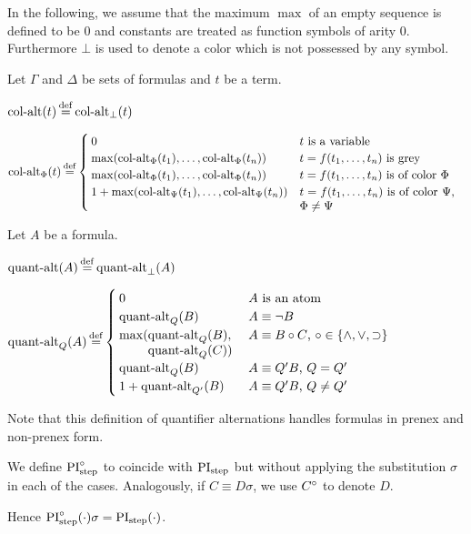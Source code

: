 \documentclass[,%
	draft=false,%
	numbers=noendperiod
	12pt,
	a4paper,
	oneside,%
	openany,
]{memoir}
\begin{document}
In the following, we assume that the maximum $\max$ of an empty sequence is defined to be $0$ and constants are treated as function symbols of arity $0$.
Furthermore $\bot$ is used to denote a color which is not possessed by any symbol.
\begin{defi}
	Let $\Gamma$ and $\Delta$ be sets of formulas and $t$ be a term.

	\medskip

	\noindent
	$\ca(t) \defeq \ca_\bot(t)$
	\medskip

	\noindent
	$
	\ca_\Phi(t) \defeq 
	\begin{cases}
		0 & \text{$t$ is a variable} \\
		\max(\ca_\Phi(t_1), \dots, \ca_\Phi(t_n)) & \text{$t = f(t_1, \dots, t_n)$ is grey} \\
		\max(\ca_\Phi(t_1), \dots, \ca_\Phi(t_n)) & \parbox[t]{0.4\textwidth}{$t = f(t_1, \dots, t_n)$ is of color $\Phi$} \\
		1 + \max(\ca_\Psi(t_1), \dots, \ca_\Psi(t_n)) & \parbox[t]{0.38\textwidth}{$t = f(t_1, \dots, t_n)$ is of color $\Psi$, $\Phi \neq \Psi$} \\
	\end{cases}
	$
\end{defi}


\begin{defi}
	Let $A$ be a formula.\nopagebreak
	\medskip

	\noindent
	$\qa(A) \defeq \qa_\bot(A)$
	\nopagebreak
	\medskip

	\noindent
	$
	\qa_Q(A) \defeq 
	\begin{cases}
		0 & \text{$A$ is an atom} \\
		\qa_Q(B) & \text{$A \equiv \lnot B$} \\
		\max(\parbox[t]{0.2\textwidth}{$\qa_Q(B),$\newline$ \qa_Q(C))$} & \text{$A \equiv B \circ C$, $\circ \in \{\land, \lor, \limpl\}$} \\
		\qa_Q(B) & \text{$A \equiv Q' B$, $Q = Q'$} \\
		1+\qa_{Q'}(B) & \text{$A \equiv Q' B$, $Q \neq Q'$}  \\
	\end{cases}
	$
	\nopagebreak

	\qedhere
\end{defi}
Note that this definition of quantifier alternations handles formulas in prenex and non-prenex form.

\begin{defi}
	We define $\operatorname{PI}^{\circ}_{\mathrm{step}}$ to coincide with $\operatorname{PI}_{\mathrm{step}}$ but without applying the substitution $\sigma$ in each of the cases.
	Analogously, if $C \equiv D\sigma$, we use $C^\circ$ to denote\nolinebreak{} $D$.
\end{defi}
Hence $\operatorname{PI}^{\circ}_{\mathrm{step}}(\cdot) \sigma = \operatorname{PI}_{\mathrm{step}}(\cdot)$.
\end{document}
